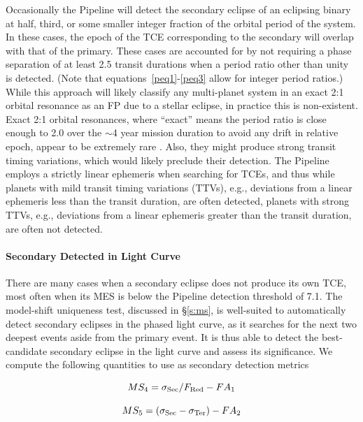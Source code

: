 Occasionally the \kepler{} Pipeline will detect the secondary eclipse of an eclipsing binary at half, third, or some smaller integer fraction of the orbital period of the system. In these cases, the epoch of the TCE corresponding to the secondary will overlap with that of the primary. These cases are accounted for by not requiring a phase separation of at least 2.5 transit durations when a period ratio other than unity is detected. (Note that equations~\ref{peq1}-\ref{peq3} allow for integer period ratios.) While this approach will likely classify any multi-planet system in an exact 2:1 orbital resonance as an FP due to a stellar eclipse, in practice this is non-existent. Exact 2:1 orbital resonances, where ``exact'' means the period ratio is close enough to 2.0 over the $\sim$4 year mission duration to avoid any drift in relative epoch, appear to be extremely rare \citep{Fabrycky2014}. Also, they might produce strong transit timing variations, which would likely preclude their detection. The \kepler{} Pipeline employs a strictly linear ephemeris when searching for TCEs, and thus while planets with mild transit timing variations (TTVs), e.g., deviations from a linear ephemeris less than the transit duration, are often detected, planets with strong TTVs, e.g., deviations from a linear ephemeris greater than the transit duration, are often not detected.



\paragraph{Secondary Detected in Light Curve}
\label{secdetectsec}
\label{s:second}

There are many cases when a secondary eclipse does not produce its own TCE, most often when its MES is below the \kepler{} Pipeline detection threshold of 7.1. The model-shift uniqueness test, discussed in \S\ref{s:ms}, is well-suited to automatically detect secondary eclipses in the phased light curve, as it searches for the next two deepest events aside from the primary event. It is thus able to detect the best-candidate secondary eclipse in the light curve and assess its significance. We compute the following quantities to use as secondary detection metrics

\begin{equation}
    MS_{4} = \sigma_{\rm Sec}/F_{\rm Red} - FA_{1}
\end{equation}

\begin{equation}
    MS_{5} = (\sigma_{\rm Sec} - \sigma_{\rm Ter}) - FA_{2}
\end{equation}

